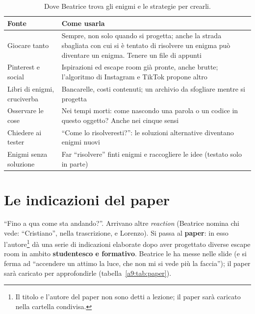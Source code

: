 \begin{table}[htbp]
\centering
\small
\begin{tabular}{@{}p{4.2cm}p{9cm}@{}}
\toprule
\textbf{Fonte} & \textbf{Come usarla} \\
\midrule
Giocare tanto & Sempre, non solo quando si progetta; anche la strada sbagliata con cui
  si è tentato di risolvere un enigma può diventare un enigma. Tenere un file di
  appunti \\
Pinterest e social & Ispirazioni ed escape room già pronte, anche brutte;
  l'algoritmo di Instagram e TikTok propone altro \\
Libri di enigmi, cruciverba & Bancarelle, costi contenuti; un archivio da sfogliare
  mentre si progetta \\
Osservare le cose & Nei tempi morti: come nascondo una parola o un codice in questo
  oggetto? Anche nei cinque sensi \\
Chiedere ai tester & ``Come lo risolveresti?'': le soluzioni alternative diventano
  enigmi nuovi \\
Enigmi senza soluzione & Far ``risolvere'' finti enigmi e raccogliere le idee
  (testato solo in parte) \\
\bottomrule
\end{tabular}
\caption{Dove Beatrice trova gli enigmi e le strategie per crearli.}
\label{a9:tab:enigmi}
\end{table}

\section{Le indicazioni del paper}
\label{a9:sec:paper}



``Fino a qua come sta andando?''. Arrivano altre \emph{reaction} (Beatrice nomina chi
vede: ``Cristiano'', nella trascrizione, e Lorenzo). Si passa al \textbf{paper}: in
esso l'autore\footnote{Il titolo e l'autore del paper non sono detti a lezione; il
paper sarà caricato nella cartella condivisa.} dà una serie di indicazioni elaborate
dopo aver progettato diverse escape room in ambito \textbf{studentesco e formativo}.
Beatrice le ha messe nelle slide (e si ferma ad ``accendere un attimo la luce, che non
mi si vede più la faccia''); il paper sarà caricato per approfondirle
(tabella~\ref{a9:tab:paper}).

